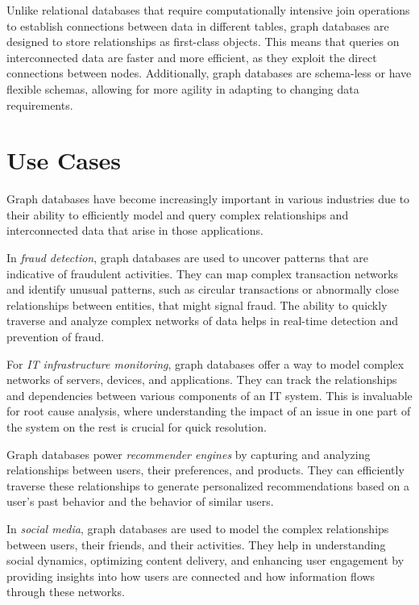 Unlike relational databases that require computationally intensive join operations to establish connections between data in different tables, graph databases are designed to store relationships as first-class objects. This means that queries on interconnected data are faster and more efficient, as they exploit the direct connections between nodes. Additionally, graph databases are schema-less or have flexible schemas, allowing for more agility in adapting to changing data requirements.

\section{Use Cases}

Graph databases have become increasingly important in various industries due to their ability to efficiently model and query complex relationships and interconnected data that arise in those applications. 

In \emph{fraud detection}, graph databases are used to uncover patterns that are indicative of fraudulent activities. They can map complex transaction networks and identify unusual patterns, such as circular transactions or abnormally close relationships between entities, that might signal fraud. The ability to quickly traverse and analyze complex networks of data helps in real-time detection and prevention of fraud.

For \emph{IT infrastructure monitoring}, graph databases offer a way to model complex networks of servers, devices, and applications. They can track the relationships and dependencies between various components of an IT system. This is invaluable for root cause analysis, where understanding the impact of an issue in one part of the system on the rest is crucial for quick resolution.

Graph databases power \emph{recommender engines} by capturing and analyzing relationships between users, their preferences, and products. They can efficiently traverse these relationships to generate personalized recommendations based on a user's past behavior and the behavior of similar users.

In \emph{social media}, graph databases are used to model the complex relationships between users, their friends, and their activities. They help in understanding social dynamics, optimizing content delivery, and enhancing user engagement by providing insights into how users are connected and how information flows through these networks.

